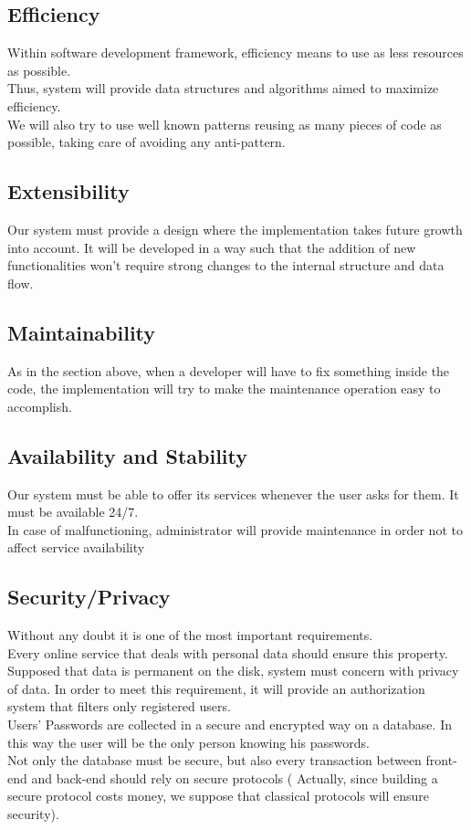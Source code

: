 \documentclass[12pt]{book}
\begin{document}
	\subsection{Efficiency}
		Within software development framework, efficiency means to use as less resources as possible. \\ Thus, system will provide data structures and algorithms aimed to maximize efficiency. \\ 
		We will also try to use well known patterns reusing as many pieces of code as possible, taking care of avoiding any anti-pattern. \\ 
	\subsection{Extensibility}
		Our system must provide a design where the implementation takes future growth into account. It will be developed in a way such that the addition of new functionalities won't require strong changes to the internal structure and data flow. \\
	\subsection{Maintainability}
		As in the section above, when a developer will have to fix something inside the code, the implementation will try to make the maintenance operation easy to accomplish.\\
	\subsection{Availability and Stability}
		Our system must be able to offer its services whenever the user asks for them. It must be available 24/7.\\
		In case of malfunctioning, administrator will provide maintenance in order not to affect service availability\\
	\subsection{Security/Privacy}
		Without any doubt it is one of the most important requirements. \\ Every online service that deals with personal data should ensure this property. Supposed that data is permanent on the disk, system must concern with privacy of data. In order to meet this requirement, it will provide an authorization system that filters only registered users. \\
		Users' Passwords are collected in a secure and encrypted way on a database. In this way the user will be the only person knowing his passwords. \\ 
		Not only the database must be secure, but also every transaction between front-end and back-end should rely on secure protocols ( Actually, since building a secure protocol costs money, we suppose that classical protocols will ensure security). 
\end{document}
